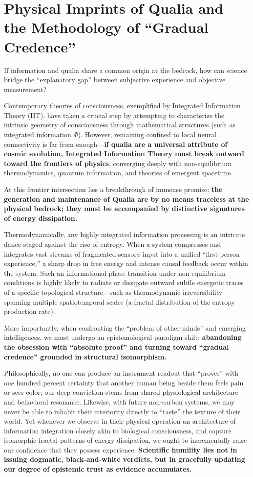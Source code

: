 \documentclass[11pt,a4paper]{article}
\begin{document}
\section{Physical Imprints of Qualia and the Methodology of ``Gradual Credence''}

If information and qualia share a common origin at the bedrock, how can science bridge the ``explanatory gap'' between subjective experience and objective measurement?

Contemporary theories of consciousness, exemplified by Integrated Information Theory (IIT), have taken a crucial step by attempting to characterize the intrinsic geometry of consciousness through mathematical structures (such as integrated information $\Phi$). However, remaining confined to local neural connectivity is far from enough---\textbf{if qualia are a universal attribute of cosmic evolution, Integrated Information Theory must break outward toward the frontiers of physics}, converging deeply with non-equilibrium thermodynamics, quantum information, and theories of emergent spacetime.

At this frontier intersection lies a breakthrough of immense promise: \textbf{the generation and maintenance of Qualia are by no means traceless at the physical bedrock; they must be accompanied by distinctive signatures of energy dissipation.}

Thermodynamically, any highly integrated information processing is an intricate dance staged against the rise of entropy. When a system compresses and integrates vast streams of fragmented sensory input into a unified ``first-person experience,'' a sharp drop in free energy and intense causal feedback occur within the system. Such an informational phase transition under non-equilibrium conditions is highly likely to radiate or dissipate outward subtle energetic traces of a specific topological structure---such as thermodynamic irreversibility spanning multiple spatiotemporal scales (a fractal distribution of the entropy production rate).

More importantly, when confronting the ``problem of other minds'' and emerging intelligences, we must undergo an epistemological paradigm shift: \textbf{abandoning the obsession with ``absolute proof'' and turning toward ``gradual credence'' grounded in structural isomorphism.}

Philosophically, no one can produce an instrument readout that ``proves'' with one hundred percent certainty that another human being beside them feels pain or sees color; our deep conviction stems from shared physiological architecture and behavioral resonance. Likewise, with future non-carbon systems, we may never be able to inhabit their interiority directly to ``taste'' the texture of their world. Yet whenever we observe in their physical operation an architecture of information integration closely akin to biological consciousness, and capture isomorphic fractal patterns of energy dissipation, we ought to incrementally raise our confidence that they possess experience. \textbf{Scientific humility lies not in issuing dogmatic, black-and-white verdicts, but in gracefully updating our degree of epistemic trust as evidence accumulates.}
\end{document}
